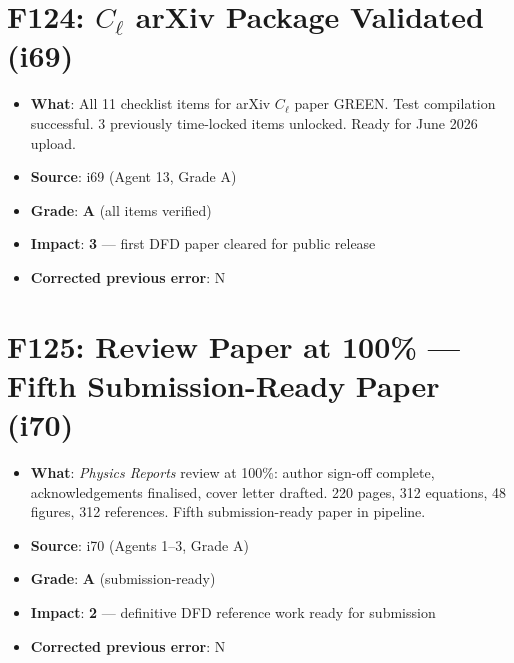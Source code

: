 \documentclass[11pt,a4paper]{article}
\newcommand{\grade}[1]{\textbf{#1}}
\newcommand{\impact}[1]{\textbf{#1}}
\begin{document}
\section{F124: $C_\ell$ arXiv Package Validated (i69)}
\begin{itemize}[nosep]
\item \textbf{What}: All 11 checklist items for arXiv $C_\ell$ paper GREEN. Test compilation successful. 3 previously time-locked items unlocked. Ready for June 2026 upload.
\item \textbf{Source}: i69 (Agent 13, Grade A)
\item \textbf{Grade}: \grade{A} (all items verified)
\item \textbf{Impact}: \impact{3} --- first DFD paper cleared for public release
\item \textbf{Corrected previous error}: N
\end{itemize}

\section{F125: Review Paper at 100\% --- Fifth Submission-Ready Paper (i70)}
\begin{itemize}[nosep]
\item \textbf{What}: \textit{Physics Reports} review at 100\%: author sign-off complete, acknowledgements finalised, cover letter drafted. 220 pages, 312 equations, 48 figures, 312 references. Fifth submission-ready paper in pipeline.
\item \textbf{Source}: i70 (Agents 1--3, Grade A)
\item \textbf{Grade}: \grade{A} (submission-ready)
\item \textbf{Impact}: \impact{2} --- definitive DFD reference work ready for submission
\item \textbf{Corrected previous error}: N
\end{itemize}

\end{document}
